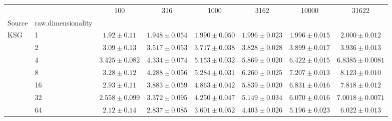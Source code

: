 \begin{tabular}{llcccccc}
\toprule
 &  & 100 & 316 & 1000 & 3162 & 10000 & 31622 \\
Source & raw.dimensionality &  &  &  &  &  &  \\
\midrule
\multirow[l]{7}{*}{KSG} & 1 & $1.92 \pm 0.11$ & $1.948 \pm 0.054$ & $1.990 \pm 0.050$ & $1.996 \pm 0.023$ & $1.996 \pm 0.015$ & $2.000 \pm 0.012$ \\
 & 2 & $3.09 \pm 0.13$ & $3.517 \pm 0.053$ & $3.717 \pm 0.038$ & $3.828 \pm 0.028$ & $3.899 \pm 0.017$ & $3.936 \pm 0.013$ \\
 & 4 & $3.425 \pm 0.082$ & $4.334 \pm 0.074$ & $5.153 \pm 0.032$ & $5.869 \pm 0.020$ & $6.422 \pm 0.015$ & $6.8385 \pm 0.0081$ \\
 & 8 & $3.28 \pm 0.12$ & $4.288 \pm 0.056$ & $5.284 \pm 0.031$ & $6.260 \pm 0.025$ & $7.207 \pm 0.013$ & $8.123 \pm 0.010$ \\
 & 16 & $2.93 \pm 0.11$ & $3.883 \pm 0.059$ & $4.863 \pm 0.042$ & $5.839 \pm 0.020$ & $6.831 \pm 0.016$ & $7.818 \pm 0.012$ \\
 & 32 & $2.558 \pm 0.099$ & $3.372 \pm 0.095$ & $4.250 \pm 0.047$ & $5.149 \pm 0.034$ & $6.070 \pm 0.016$ & $7.0018 \pm 0.0071$ \\
 & 64 & $2.12 \pm 0.14$ & $2.837 \pm 0.085$ & $3.601 \pm 0.052$ & $4.403 \pm 0.026$ & $5.196 \pm 0.023$ & $6.022 \pm 0.013$ \\
\bottomrule
\end{tabular}
